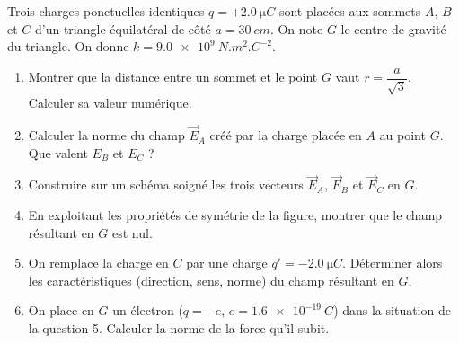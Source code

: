 \documentclass[11pt]{article}
\begin{document}
\begin{exercice}
Trois charges ponctuelles identiques $q = +\SI{2,0}{\micro C}$ sont placées aux sommets $A$, $B$ et $C$ d'un triangle équilatéral de côté $a = \SI{30}{cm}$. On note $G$ le centre de gravité du triangle. On donne $k = \SI{9,0e9}{N.m^2.C^{-2}}$.
\begin{enumerate}
\item Montrer que la distance entre un sommet et le point $G$ vaut $r = \dfrac{a}{\sqrt{3}}$. Calculer sa valeur numérique.
\item Calculer la norme du champ $\vec{E}_A$ créé par la charge placée en $A$ au point $G$. Que valent $E_B$ et $E_C$ ?
\item Construire sur un schéma soigné les trois vecteurs $\vec{E}_A$, $\vec{E}_B$ et $\vec{E}_C$ en $G$.
\item En exploitant les propriétés de symétrie de la figure, montrer que le champ résultant en $G$ est nul.
\item On remplace la charge en $C$ par une charge $q' = -\SI{2,0}{\micro C}$. Déterminer alors les caractéristiques (direction, sens, norme) du champ résultant en $G$.
\item On place en $G$ un électron ($q = -e$, $e = \SI{1,6e-19}{C}$) dans la situation de la question 5. Calculer la norme de la force qu'il subit.
\end{enumerate}
\end{exercice}
\end{document}
